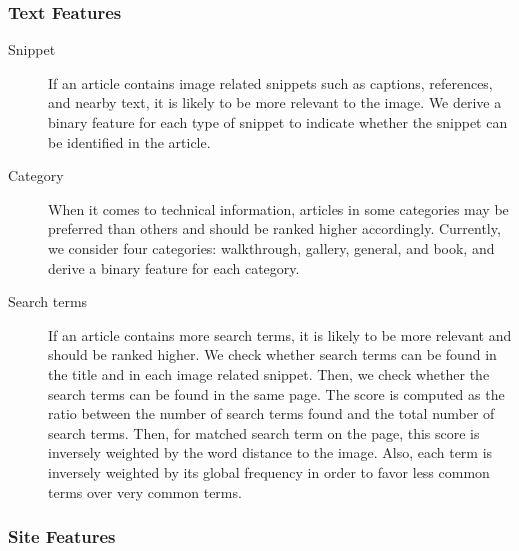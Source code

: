\documentclass{www2010-submission}
\begin{document}
\subsubsection{Text Features}

\begin{description}

\item[Snippet] If an article contains image related snippets such as
  captions, references, and nearby text, it is likely to be more
  relevant to the image. We derive a binary feature for each type of
  snippet to indicate whether the snippet can be identified in the
  article.

\item[Category] When it comes to technical information, articles in
  some categories may be preferred than others and should be ranked
  higher accordingly. Currently, we consider four categories:
  walkthrough, gallery, general, and book, and derive a binary feature
  for each category.

\item[Search terms] If an article contains more search terms, it is
  likely to be more relevant and should be ranked higher. We check
  whether search terms can be found in the title and in each image
  related snippet. Then, we check whether the search terms can be
  found in the same page. The score is computed as the ratio between
  the number of search terms found and the total number of search
  terms. Then, for matched search term on the page, this score is
  inversely weighted by the word distance to the image. Also, each
  term is inversely weighted by its global frequency in order to favor
  less common terms over very common terms.

\end{description}

\subsubsection{Site Features}
\end{document}
